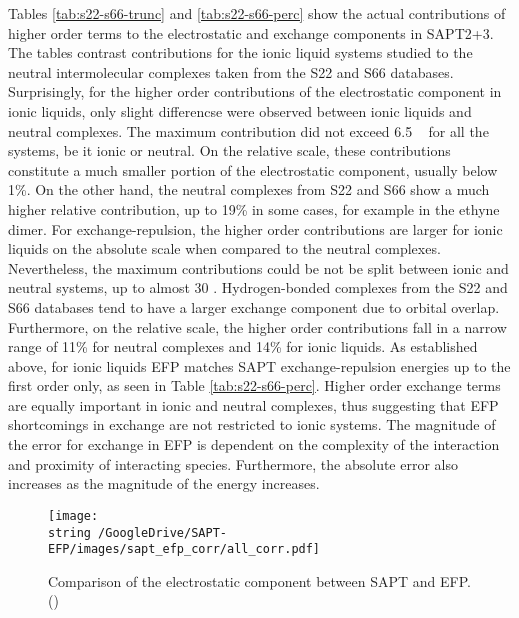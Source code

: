 Tables \ref{tab:s22-s66-trunc} and \ref{tab:s22-s66-perc} show the actual contributions of higher order terms to the electrostatic and exchange components in SAPT2+3.
The tables contrast contributions for the ionic liquid systems studied to the neutral intermolecular complexes taken from the S22 and S66 databases.
Surprisingly, for the higher order contributions of the electrostatic component in ionic liquids, only slight differencse were observed between ionic liquids and neutral complexes.
The maximum contribution did not exceed 6.5 \enUnit~ for all the systems, be it ionic or neutral.
On the relative scale, these contributions constitute a much smaller portion of the electrostatic component, usually below 1\%. 
On the other hand, the neutral complexes from S22 and S66 show a much higher relative contribution, up to 19\% in some cases, for example in the ethyne dimer.
For exchange-repulsion, the higher order contributions are larger for ionic liquids on the absolute scale when compared to the neutral complexes.
Nevertheless, the maximum contributions could be not be split between ionic and neutral systems, up to almost 30 \enUnit.
Hydrogen-bonded complexes from the S22 and S66 databases tend to have a larger exchange component due to orbital overlap.
Furthermore, on the relative scale, the higher order contributions fall in a narrow range of 11\% for neutral complexes and 14\% for ionic liquids.
As established above, for ionic liquids EFP matches SAPT exchange-repulsion energies up to the first order only, as seen in Table \ref{tab:s22-s66-perc}.
Higher order exchange terms are equally important in ionic and neutral complexes, thus suggesting that EFP shortcomings in exchange are not restricted to ionic systems.
The magnitude of the error for exchange in EFP is dependent on the complexity of the interaction and proximity of interacting species. 
Furthermore, the absolute error also increases as the magnitude of the energy increases.


\begin{figure}[h]
    \caption{Comparison of the electrostatic component between SAPT and EFP. (\enUnit)}
    \label{fig:sapt-efp-corr-all}
    \centering
    \texttt{[image: \\string~/GoogleDrive/SAPT-EFP/images/sapt\_efp\_corr/all\_corr.pdf]}
\end{figure}



